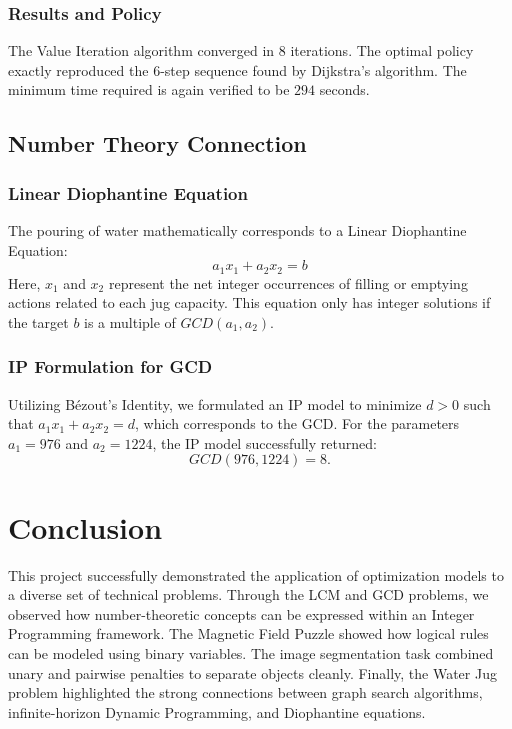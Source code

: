 \documentclass[11pt,a4paper]{article}
\begin{document}
\subsubsection*{Results and Policy}
The Value Iteration algorithm converged in $8$ iterations. The optimal policy exactly reproduced the $6$-step sequence found by Dijkstra's algorithm. The minimum time required is again verified to be $294$ seconds.

\subsection*{Number Theory Connection}

\subsubsection*{Linear Diophantine Equation}
The pouring of water mathematically corresponds to a Linear Diophantine Equation:
\[
a_1x_1+a_2x_2=b
\]
Here, $x_1$ and $x_2$ represent the net integer occurrences of filling or emptying actions related to each jug capacity. This equation only has integer solutions if the target $b$ is a multiple of $GCD(a_1, a_2)$.

\subsubsection*{IP Formulation for GCD}
Utilizing B\'ezout's Identity, we formulated an IP model to minimize $d > 0$ such that $a_1x_1+a_2x_2=d$, which corresponds to the GCD. For the parameters $a_1=976$ and $a_2=1224$, the IP model successfully returned:
\[
GCD(976,1224)=8.
\]

\section*{Conclusion}

This project successfully demonstrated the application of optimization models to a diverse set of technical problems. Through the LCM and GCD problems, we observed how number-theoretic concepts can be expressed within an Integer Programming framework. The Magnetic Field Puzzle showed how logical rules can be modeled using binary variables. The image segmentation task combined unary and pairwise penalties to separate objects cleanly. Finally, the Water Jug problem highlighted the strong connections between graph search algorithms, infinite-horizon Dynamic Programming, and Diophantine equations.
\end{document}
